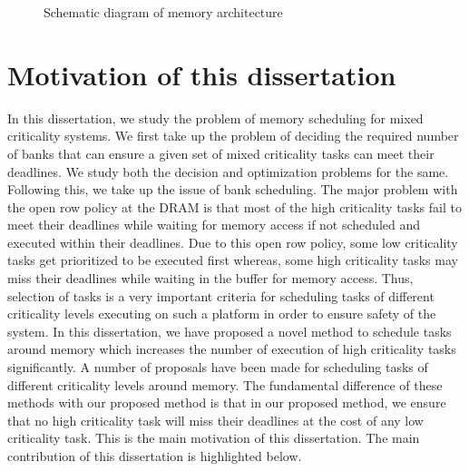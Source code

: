 \begin{figure}[t]
 
 \centering
\caption{Schematic diagram of memory architecture}
\label{fig1ddd}
\end{figure}

\section{Motivation of this dissertation}\label{motiv}
\noindent
In this dissertation, we study the problem of memory scheduling for mixed criticality systems. We first take up the problem of deciding the required number of banks that can ensure a given set of mixed criticality tasks can meet their deadlines. We study both the decision and optimization problems for the same. Following this, we take up the issue of bank scheduling. 
The major problem with the open row policy at the DRAM is that most of the high criticality tasks fail to meet their 
deadlines while waiting for memory access if not scheduled and executed within their deadlines.
Due to this open row policy, some low criticality tasks get prioritized to be executed first 
whereas, some high criticality tasks may miss their deadlines while waiting in the buffer for memory access. Thus, selection 
of tasks is a very important criteria for 
scheduling tasks of different criticality levels executing on such a platform in order to ensure safety of the system.
In this dissertation, we have proposed a novel method to schedule tasks around memory which increases the number of execution 
of high criticality tasks significantly. A number of proposals have been made for scheduling tasks of different criticality 
levels around memory. The fundamental difference of these methods with our proposed method is that in our proposed method, 
we ensure that no high criticality task will miss their deadlines at the cost of any low criticality task. This is the main 
motivation of this dissertation. The main contribution of this dissertation is highlighted below.

